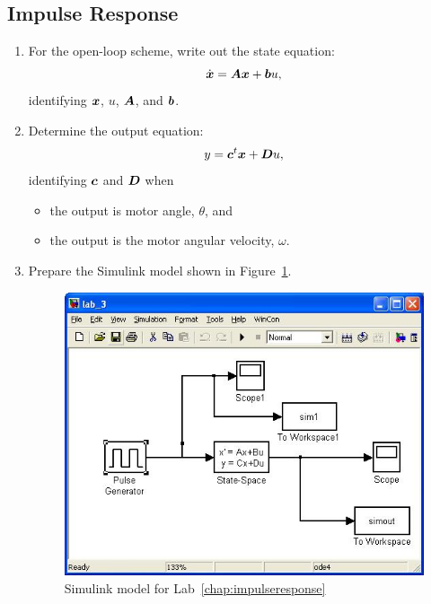\subsection{Impulse Response}\label{cha:impulseRes}

\begin{enumerate}
\item For the open-loop scheme, write out the state equation:
\begin{equation*}
\dot{\boldsymbol{x}}=\boldsymbol{A}\boldsymbol{x}+\boldsymbol{b}u,
\end{equation*}
identifying $\boldsymbol{x}$\@, $u$\@, $\boldsymbol{A}$\@, and $\boldsymbol{b}$\@.

\item Determine the output equation:
\begin{equation}
y=\boldsymbol{c}^{t}\boldsymbol{x}+\boldsymbol{D}u,
\end{equation}
identifying $\boldsymbol{c}$ and $\boldsymbol{D}$ when
\begin{itemize}
\item the output is motor angle, $\theta$\@, and
\item the output is the motor angular velocity, $\omega$.
\end{itemize}

\item Prepare the \textsf{Simulink} model shown in Figure~\ref{fig:model3}.
\begin{figure}[htbp]
\centering
\includegraphics[width=0.6\hsize]{pix/impulseResponseModel.jpg}
\caption{\textsf{Simulink} model for Lab~\ref{chap:impulseresponse}}\label{fig:model3}
\end{figure}%


\end{enumerate}
